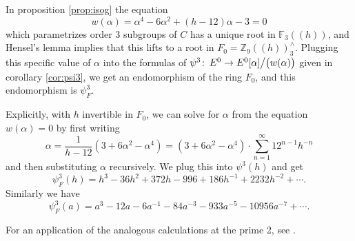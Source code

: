 \documentclass{gtpart}
\theoremstyle{definition}
\theoremstyle{remark}
\def\co{\colon\thinspace}
\newcommand{\mb}[1]{\mathbb{#1}}
\newcommand{\BF}{{\mb F}}
\newcommand{\BZ}{{\mb Z}}
\newcommand{\A}{\alpha}
\newcommand{\p}{\psi^3}
\begin{document}
In proposition \ref{prop:isog} the equation 
\[
 w(\A) = \A^4 - 6 \A^2 + (h - 12) \A - 3 = 0 
\]
which parametrizes order 3 subgroups of $C$ has a unique root 
in $\BF_3 (\!(h)\!)$, and Hensel's lemma implies that this lifts to a 
root in $F_0 = \BZ_9 (\!(h)\!)_3^\wedge$.  Plugging this 
specific value of $\A$ into the formulas of $\p \co E^0 \to E^0 [\A] \big/ \big( w(\A) \big)$ given in corollary \ref{cor:psi3}, we 
get an endomorphism of the ring $F_0$, and this endomorphism is $\psi_F^3$.  

Explicitly, with $h$ invertible in $F_0$, we can solve for $\A$ from the equation $w(\A) = 0$ by first writing 
\[
 \A = \frac{1}{h - 12} (3 + 6 \A^2 - \A^4) = (3 + 6 \A^2 - \A^4) \cdot \sum_{n = 1}^\infty 12^{n-1} h^{-n} 
\]
and then substituting $\A$ recursively.  We plug this into $\p(h)$ and get 
\[
 \psi_F^3(h) = h^3 - 36 h^2 + 372 h - 996 + 186 h^{-1} + 2232 h^{-2} + \cdots.  
\]
Similarly we have 
\[
 \psi_F^3(a) = a^3 - 12 a - 6 a^{-1} - 84 a^{-3} - 933 a^{-5} - 10956 a^{-7} + \cdots.  
\]

For an application of the analogous calculations at the prime 2, see \cite[section 8.2]{level3}.  


\newpage

%
%
\end{document}
